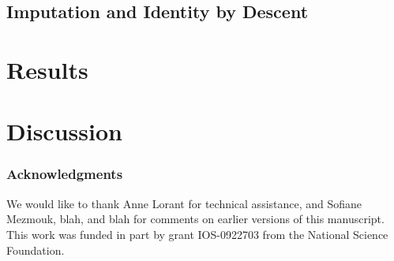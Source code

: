 \documentclass[12pt]{article}
\begin{document}
\subsection{Imputation and Identity by Descent} %

\section{Results}

\section{Discussion}

\subsubsection*{Acknowledgments}
We would like to thank Anne Lorant for technical assistance, and Sofiane Mezmouk, blah, and blah for comments on earlier versions of this manuscript.  This work was funded in part by grant IOS-0922703 from the National Science Foundation.

\clearpage

\end{document}
